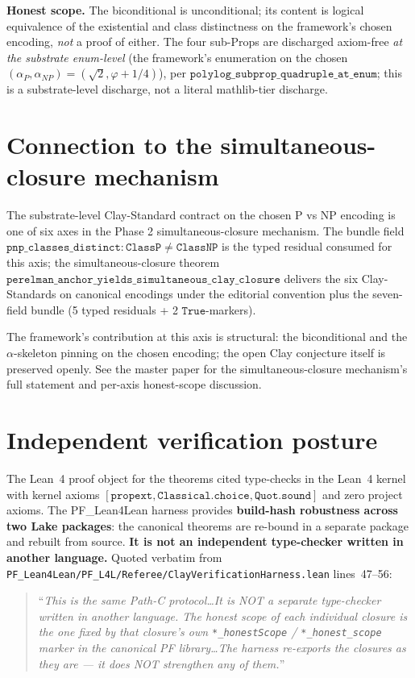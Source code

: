 \documentclass[11pt,a4paper]{article}
\theoremstyle{plain}
\theoremstyle{definition}
\begin{document}
\noindent\textbf{Honest scope.} The biconditional is unconditional;
its content is logical equivalence of the existential and class
distinctness on the framework's chosen encoding, \emph{not} a proof
of either. The four sub-Props are discharged axiom-free \emph{at the
substrate enum-level} (the framework's enumeration on the chosen
$(\alpha_{P}, \alpha_{NP}) = (\sqrt{2}, \varphi + 1/4)$), per
$\mathtt{polylog\_subprop\_quadruple\_at\_enum}$; this is a
substrate-level discharge, not a literal mathlib-tier discharge.

\section{Connection to the simultaneous-closure mechanism}
\label{sec:simultaneous-pointer}

The substrate-level Clay-Standard contract on the chosen P vs NP
encoding is one of six axes in the Phase 2 simultaneous-closure
mechanism. The bundle field $\mathtt{pnp\_classes\_distinct} :
\mathtt{ClassP} \neq \mathtt{ClassNP}$ is the typed residual
consumed for this axis; the simultaneous-closure theorem
$\mathtt{perelman\_anchor\_yields\_simultaneous\_clay\_closure}$
delivers the six Clay-Standards on canonical encodings under the
editorial convention plus the seven-field bundle (5 typed residuals
+ 2 $\mathtt{True}$-markers).

The framework's contribution at this axis is structural: the
biconditional and the $\alpha$-skeleton pinning on the chosen
encoding; the open Clay conjecture itself is preserved openly. See
the master paper \cite{master_substrate} for the simultaneous-closure
mechanism's full statement and per-axis honest-scope discussion.

\section{Independent verification posture}
\label{sec:l4l}

The Lean~4 proof object for the theorems cited type-checks in the
Lean~4 kernel with kernel axioms $\mathtt{[propext, Classical.choice,
Quot.sound]}$ and zero project axioms. The PF\_Lean4Lean harness
provides \textbf{build-hash robustness across two Lake packages}:
the canonical theorems are re-bound in a separate package and
rebuilt from source. \textbf{It is not an independent type-checker
written in another language.} Quoted verbatim from
\texttt{PF\_Lean4Lean/PF\_L4L/Referee/ClayVerificationHarness.lean}
lines~47--56:
\begin{quote}
``\emph{This is the same Path-C protocol\ldots It is NOT a separate
type-checker written in another language. The honest scope of each
individual closure is the one fixed by that closure's own
\texttt{*\_honestScope} / \texttt{*\_honest\_scope} marker in the
canonical PF library\ldots The harness re-exports the closures as
they are --- it does NOT strengthen any of them.}''
\end{quote}
\end{document}
